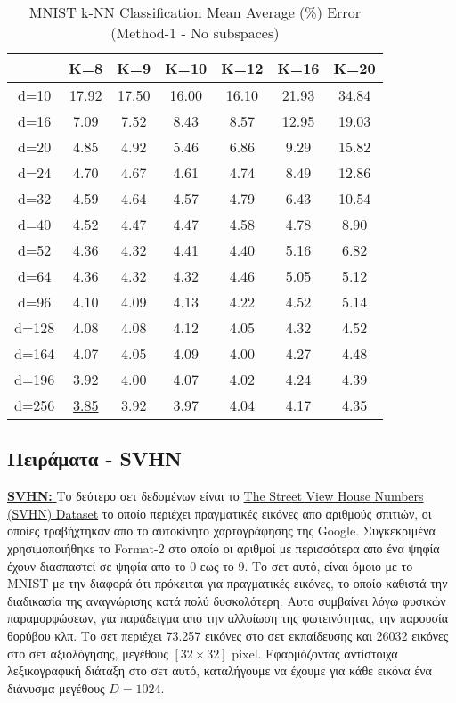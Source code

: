 \begin{table}[H]
\centering
\label{tab:table10}
\begin{tabular}{|c|c|c|c|c|c|c|}
\hline
& K=8 & K=9 & K=10 & K=12 & K=16 & K=20 \\
\hline
d=10 & 17.92 & 17.50 & 16.00 & 16.10 & 21.93 & 34.84 \\
d=16 & 7.09 & 7.52 & 8.43 & 8.57 & 12.95 & 19.03 \\
d=20 & 4.85 & 4.92 & 5.46 & 6.86 & 9.29 & 15.82 \\
d=24 & 4.70 & 4.67 & 4.61 & 4.74 & 8.49 & 12.86 \\
d=32 & 4.59 & 4.64 & 4.57 & 4.79 & 6.43 & 10.54 \\
d=40 & 4.52 & 4.47 & 4.47 & 4.58 & 4.78 & 8.90 \\
d=52 & 4.36 & 4.32 & 4.41 & 4.40 & 5.16 & 6.82 \\
d=64 & 4.36 & 4.32 & 4.32 & 4.46 & 5.05 & 5.12 \\
d=96 & 4.10 & 4.09 & 4.13 & 4.22 & 4.52 & 5.14 \\
d=128 & 4.08 & 4.08 & 4.12 & 4.05 & 4.32 & 4.52 \\
d=164 & 4.07 & 4.05 & 4.09 & 4.00 & 4.27 & 4.48 \\
d=196 & 3.92 & 4.00 & 4.07 & 4.02 & 4.24 & 4.39 \\
d=256 & \underline{3.85} & 3.92 & 3.97 & 4.04 & 4.17 & 4.35 \\
\hline
\end{tabular}
\caption{MNIST k-NN Classification Mean Average (\%) Error (Method-1 - No subspaces)}
\end{table}

\subsection{Πειράματα - \textlatin{SVHN}}
\par
\href{http://ufldl.stanford.edu/housenumbers/}{\textbf{\textlatin{SVHN: }}}Το δεύτερο σετ δεδομένων είναι το \href{http://ufldl.stanford.edu/housenumbers/}{\textlatin{The Street View House Numbers (SVHN) Dataset}}\cite{12} το οποίο περιέχει πραγματικές εικόνες απο αριθμούς σπιτιών, οι οποίες τραβήχτηκαν απο το αυτοκίνητο χαρτογράφησης της \textlatin{Google}. Συγκεκριμένα χρησιμοποιήθηκε το \textlatin{Format-2} στο οποίο οι αριθμοί με περισσότερα απο ένα ψηφία έχουν διασπαστεί σε ψηφία απο το 0 εως το 9. Το σετ αυτό, είναι όμοιο με το \textlatin{MNIST} με την διαφορά ότι πρόκειται για πραγματικές εικόνες, το οποίο καθιστά την διαδικασία της αναγνώρισης κατά πολύ δυσκολότερη. Αυτο συμβαίνει λόγω φυσικών παραμορφώσεων, για παράδειγμα απο την αλλοίωση της φωτεινότητας, την παρουσία θορύβου κλπ. Το σετ περιέχει 73.257 εικόνες στο σετ εκπαίδευσης και 26032 εικόνες στο σετ αξιολόγησης, μεγέθους $[32 \times 32]$ \textlatin{pixel}. Εφαρμόζοντας αντίστοιχα λεξικογραφική διάταξη στο σετ αυτό, καταλήγουμε να έχουμε για κάθε εικόνα ένα διάνυσμα μεγέθους $D = 1024$. 


